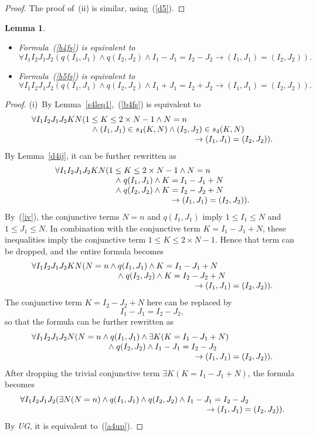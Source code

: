 \documentclass[11pt]{article}
\newtheorem{lemma}{Lemma}
\def\beq{\begin{equation}}
\def\eeq#1{\label{#1}\end{equation}}
\def\ba{\begin{array}}
\def\ea{\end{array}}
\begin{document}
\begin{adjustwidth}{-1cm}{-1cm}
\begin{proof}
The proof of~(ii) is similar, using~(\ref{d5}).
\end{proof}
\begin{lemma}\label{lem:at}
\strut\vskip 4mm
  
\begin{itemize}
\item[(i)]
Formula~(\ref{b4fs}) is equivalent to
\beq\forall I_1I_2J_1J_2
(q(I_1,J_1)\land q(I_2,J_2) \land I_1-J_1=I_2-J_2
\to (I_1,J_1) = (I_2,J_2)).
\eeq{a4up}
\item[(ii)]
Formula~(\ref{b5fs}) is equivalent to
\beq\forall I_1I_2J_1J_2
(q(I_1,J_1)\land q(I_2,J_2) \land I_1+J_1=I_2+J_2
\to (I_1,J_1) = (I_2,J_2)).
\eeq{a4down}
\end{itemize}
\end{lemma}
\begin{proof}
(i)~By Lemma~\ref{s4leq1},~(\ref{b4fs}) is equivalent to
$$
\ba l
\forall I_1I_2J_1J_2KN(1\leq K\leq 2\times N-1 \land N=n\\
\hskip 2.6cm
\land\; (I_1,J_1)\in s_4(K,N) \land (I_2,J_2)\in s_4(K,N)\\
\hskip 7cm
\to (I_1,J_1)=(I_2,J_2)).
\ea
$$
By Lemma~\ref{d4ij}, it can be further rewritten as
$$
\ba l
\forall I_1I_2J_1J_2KN(1\leq K\leq 2\times N-1 \land N=n\\
\hskip 2.6cm
\land\; q(I_1,J_1) \land K=I_1-J_1+N\\
\hskip 2.6cm
\land\; q(I_2,J_2) \land K=I_2-J_2+N\\
\hskip 5cm
\to (I_1,J_1)=(I_2,J_2)).
\ea
$$
By~(\ref{iv}), the conjunctive terms $N=n$ and $q(I_1,J_1)$ imply
$1\leq I_1 \leq N$ and  $1\leq J_1 \leq N$.  In combination
with the conjunctive term $K=I_1-J_1+N$, these inequalities imply
the conjunctive term $1\leq K\leq 2\times N-1$.  Hence that term can be
dropped, and the entire formula becomes
$$\ba l
\forall I_1I_2J_1J_2KN(N=n\land q(I_1,J_1) \land K=I_1-J_1+N\\
\hskip 3.7cm
\land\; q(I_2,J_2) \land K=I_2-J_2+N\\
\hskip 7cm
\to (I_1,J_1)=(I_2,J_2)).
\ea
$$
The conjunctive term $K=I_2-J_2+N$ here can be replaced by
$$I_1-J_1=I_2-J_2,$$
so that the formula can be further rewritten as
$$\ba l
\forall I_1I_2J_1J_2N(N=n\land q(I_1,J_1) \land \exists K(K=I_1-J_1+N)\\
\hskip 3.3cm
\land\; q(I_2,J_2) \land I_1-J_1=I_2-J_2\\
\hskip 7cm
\to (I_1,J_1)=(I_2,J_2)).
\ea
$$
After dropping the trivial conjunctive term $\exists K(K=I_1-J_1+N)$, the
formula becomes
$$\ba l
\forall I_1I_2J_1J_2(\exists N(N=n) \land q(I_1,J_1) \land
q(I_2,J_2) \land I_1-J_1=I_2-J_2\\
\hskip 8cm
\to (I_1,J_1)=(I_2,J_2)).
\ea
$$
By \emph{UG}, it is equivalent to~(\ref{a4up}).


\end{proof}
\end{adjustwidth}
\end{document}
